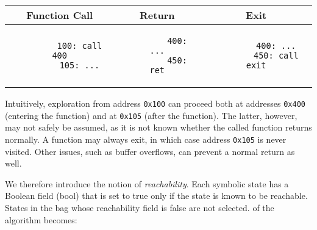 \begin{center}
  \begin{tabular}{ccc}
    \textbf{Function Call} & \textbf{Return} & \textbf{Exit} \\\hline
    \begin{minipage}{0.3\linewidth}
      \vspace{0.5ex}
      \begin{verbatim}
        100: call 400
        105: ...
      \end{verbatim}
      \vspace{-0.2ex}
    \end{minipage}
    &
    \begin{minipage}{0.2\linewidth}
      \vspace{0.5ex}
      \begin{verbatim}
        400: ...
        450: ret
      \end{verbatim}
      \vspace{-0.2ex}
    \end{minipage}
    &\begin{minipage}{0.3\linewidth}
      \vspace{0.5ex}
      \begin{verbatim}
        400: ...
        450: call exit
      \end{verbatim}
      \vspace{-0.2ex}
    \end{minipage}
    \\\hline
  \end{tabular}
\end{center}
Intuitively, exploration from address \texttt{0x100} can proceed both at addresses \texttt{0x400} (entering the function) and at \texttt{0x105} (after the function).
The latter, however, may not safely be assumed, as it is not known whether the called function returns normally.
A function may always exit, in which case address \texttt{0x105} is never visited.
Other issues, such as buffer overflows, can prevent a normal return as well.

We therefore introduce the notion of \emph{reachability}.
Each symbolic state has a Boolean field (\gls{bool}) that is set to true only if the state is known to be reachable.
States in the bag whose reachability field is false are not selected.
 of the algorithm becomes:
\\

